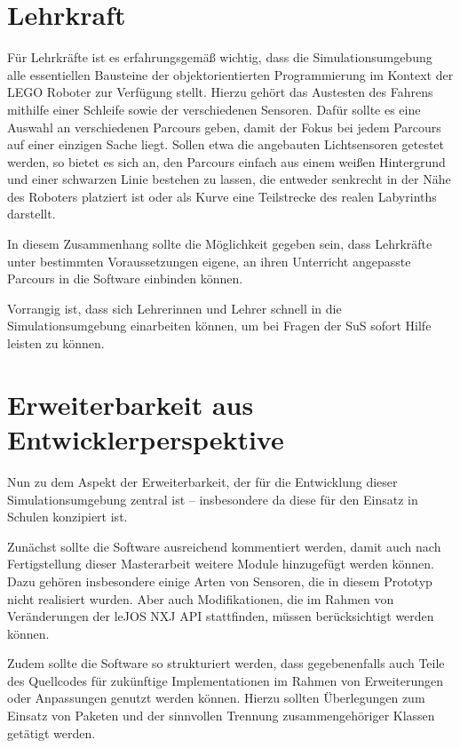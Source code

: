 \documentclass[paper=a4, DIV=calc, BCOR=12mm, twoside=on, onecolumn=on, open = right, titlepage =on, parskip =half-, headsepline = on, footsepline = off, chapterprefix = off, appendixprefix = on, fontsize = 12pt, numbers = noenddot, abstract = on]{scrbook}
\begin{document}
\vspace*{-2ex}
\par \singlespacing
\section{Lehrkraft}
\label{sec:lehrkraft}
\vspace*{-1ex}
\par \onehalfspacing
Für Lehrkräfte ist es erfahrungsgemäß wichtig, dass die Simulationsumgebung alle essentiellen Bausteine der objektorientierten Programmierung im Kontext der \textsc{LEGO} Roboter zur Verfügung stellt. Hierzu gehört das Austesten des Fahrens mithilfe einer Schleife sowie der verschiedenen Sensoren. Dafür sollte es eine Auswahl an verschiedenen Parcours geben, damit der Fokus bei jedem Parcours auf einer einzigen Sache liegt. Sollen etwa die angebauten Lichtsensoren getestet werden, so bietet es sich an, den Parcours einfach aus einem weißen Hintergrund und einer schwarzen Linie bestehen zu lassen, die entweder senkrecht in der Nähe des Roboters platziert ist oder als Kurve eine Teilstrecke des realen Labyrinths darstellt.

In diesem Zusammenhang sollte die Möglichkeit gegeben sein, dass Lehrkräfte unter bestimmten Voraussetzungen eigene, an ihren Unterricht angepasste Parcours in die Software einbinden können.

Vorrangig ist, dass sich Lehrerinnen und Lehrer schnell in die Simulationsumgebung einarbeiten können, um bei Fragen der SuS sofort Hilfe leisten zu können. 

\par \singlespacing
\section{Erweiterbarkeit aus Entwicklerperspektive} 
\label{sec:erweiterbarkeit}
\onehalfspacing
Nun zu dem Aspekt der Erweiterbarkeit, der für die Entwicklung dieser Simulationsumgebung zentral ist -- insbesondere da diese für den Einsatz in Schulen konzipiert ist.

Zunächst sollte die Software ausreichend kommentiert werden, damit auch nach Fertigstellung dieser Masterarbeit weitere Module hinzugefügt werden können. Dazu gehören insbesondere einige Arten von Sensoren, die in diesem Prototyp nicht realisiert wurden. Aber auch Modifikationen, die im Rahmen von Veränderungen der leJOS NXJ API stattfinden, müssen berücksichtigt werden können.

Zudem sollte die Software so strukturiert werden, dass gegebenenfalls auch Teile des Quellcodes für zukünftige Implementationen im Rahmen von Erweiterungen oder Anpassungen genutzt werden können. Hierzu sollten Überlegungen zum Einsatz von Paketen und der sinnvollen Trennung zusammengehöriger Klassen getätigt werden.
\end{document}
